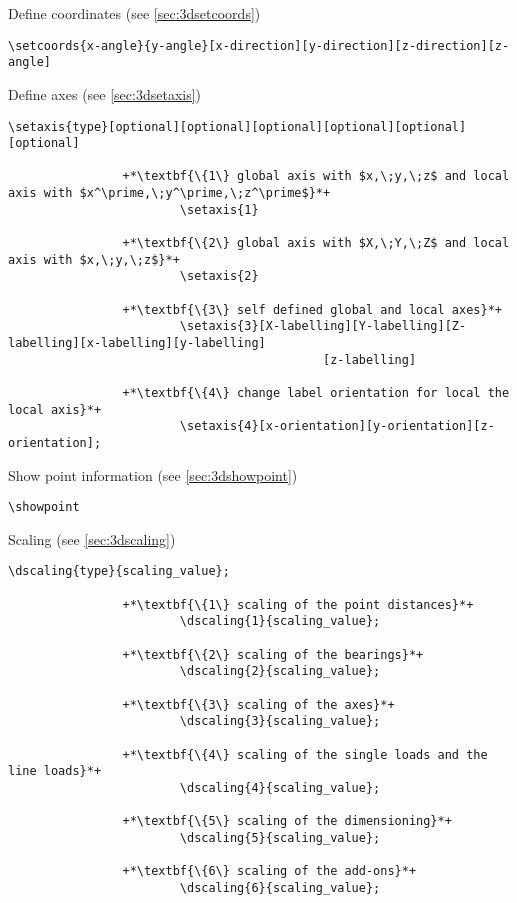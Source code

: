 \documentclass[%
  a4paper,
  BCOR20mm,
  pointlessnumbers,
  twoside,
  halfparskip,
  openright,
]{scrreprt}
\begin{document}
Define coordinates (see \ref{sec:3dsetcoords})

\begin{lstlisting}[emph={setcoords},backgroundcolor=\color{white}]
		\setcoords{x-angle}{y-angle}[x-direction][y-direction][z-direction][z-angle]
\end{lstlisting}\vspace{-10mm}

Define axes (see \ref{sec:3dsetaxis})

\begin{lstlisting}[emph={setaxis},backgroundcolor=\color{white}]
		\setaxis{type}[optional][optional][optional][optional][optional][optional]
		
				+*\textbf{\{1\} global axis with $x,\;y,\;z$ and local axis with $x^\prime,\;y^\prime,\;z^\prime$}*+
						\setaxis{1}
						
				+*\textbf{\{2\} global axis with $X,\;Y,\;Z$ and local axis with $x,\;y,\;z$}*+
						\setaxis{2}
						
				+*\textbf{\{3\} self defined global and local axes}*+
						\setaxis{3}[X-labelling][Y-labelling][Z-labelling][x-labelling][y-labelling]
											[z-labelling]
						
				+*\textbf{\{4\} change label orientation for local the local axis}*+
						\setaxis{4}[x-orientation][y-orientation][z-orientation];										
\end{lstlisting}\vspace{-10mm}

Show point information (see \ref{sec:3dshowpoint})

\begin{lstlisting}[emph={showpoint},backgroundcolor=\color{white}]
		\showpoint
\end{lstlisting}\vspace{-10mm}

Scaling (see \ref{sec:3dscaling})

\begin{lstlisting}[emph={dscaling},backgroundcolor=\color{white}]
		\dscaling{type}{scaling_value};
		
				+*\textbf{\{1\} scaling of the point distances}*+
						\dscaling{1}{scaling_value};
						
				+*\textbf{\{2\} scaling of the bearings}*+
						\dscaling{2}{scaling_value};
						
				+*\textbf{\{3\} scaling of the axes}*+
						\dscaling{3}{scaling_value};
						
				+*\textbf{\{4\} scaling of the single loads and the line loads}*+
						\dscaling{4}{scaling_value};
						
				+*\textbf{\{5\} scaling of the dimensioning}*+
						\dscaling{5}{scaling_value};
						
				+*\textbf{\{6\} scaling of the add-ons}*+
						\dscaling{6}{scaling_value};
\end{lstlisting}\vspace{-10mm}
\end{document}
